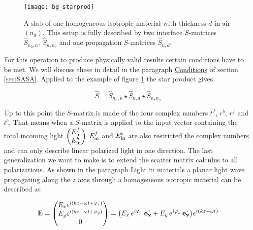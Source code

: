 \begin{figure}[H]
    \centering
    \texttt{[image: bg\_starprod]}
    \caption{A slab of one homogeneous isotropic material with thickness $d$ in air $(n_0)$. This setup is fully described by two interface $S$-matrices 
    $\hat S_{n_0,n}, \, \hat S_{n,n_0}$
    and one propagation $S$-matrices
    $\hat S_{n,d}$.}
    \label{fig:bg:star_prod}
\end{figure}

For this operation to produce physically valid results certain conditions have to be met. We will discuss these in detail in the paragraph \hyperref[par:conditions]{Conditions} of section \ref{sec:SASA}.
Applied to the example of figure \ref{fig:bg:star_prod} the star product gives

\begin{equation}
    \hat S = \hat S_{n_0, n} \star \hat S_{n, d} \star \hat S_{n, n_0}
\end{equation}

Up to this point the $S$-matrix is made of the four complex numbers $t^f$, $r^b$, $r^f$ and $t^b$. That means when a $S$-matrix is applied to the input vector containing the total incoming light  
$
\begin{pmatrix}
    E^f_{\mathrm{in}} \\
    E^b_{\mathrm{in}}
\end{pmatrix}
$
$E^f_{\mathrm{in}}$ and $E^b_{\mathrm{in}}$ are also restricted the complex numbers and can only describe linear polarized light in one direction. The last generalization we want to make is to extend the scatter matrix calculus to all polarizations. As shown in the paragraph \hyperref[par:light_in_materials]{Light in materials} a planar light wave propagating along the $z$ axis through a homogeneous isotropic material can be described as

\begin{equation}
   \vb E =
   \begin{pmatrix}
       E_x e^{i(kz - \omega t + \varphi_x)}\\
       E_y e^{i(kz - \omega t + \varphi_y)}\\
       0\\
   \end{pmatrix}
   =
   \qty(E_x \, e^{i \varphi_x} \, \va{e_x} +
        E_y \, e^{i \varphi_y} \, \va{e_y})
       e^{i(kz - \omega t)}
\end{equation}
\\

